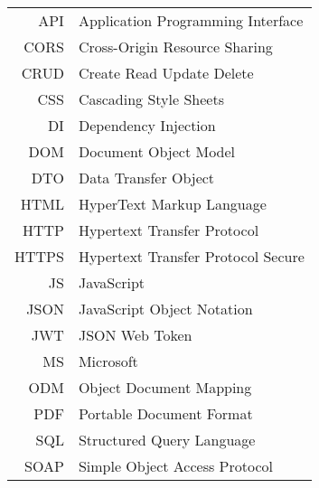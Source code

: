 \begin{longtable}{rl}
API & Application Programming Interface\\
CORS & Cross-Origin Resource Sharing\\
CRUD & Create Read Update Delete\\
CSS & Cascading Style Sheets\\
DI & Dependency Injection\\
DOM & Document Object Model\\
DTO & Data Transfer Object\\
HTML & HyperText Markup Language\\
HTTP & Hypertext Transfer Protocol\\
HTTPS & Hypertext Transfer Protocol Secure\\
JS & JavaScript\\
JSON & JavaScript Object Notation\\
JWT & JSON Web Token\\
MS & Microsoft\\
ODM & Object Document Mapping\\
PDF & Portable Document Format\\
SQL & Structured Query Language\\
SOAP & Simple Object Access Protocol\\

\end{longtable}
